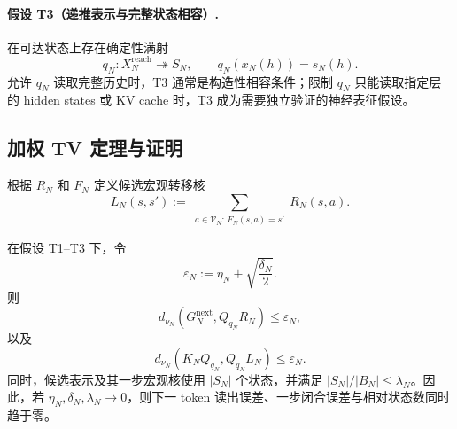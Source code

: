\paragraph{假设 T3（递推表示与完整状态相容）.}
在可达状态上存在确定性满射
\[
 q_N:X_N^{\mathrm{reach}}\twoheadrightarrow S_N,
 \qquad q_N(x_N(h))=s_N(h).
 \tag{T3}\label{eq:T3-readout}
\]
允许 $q_N$ 读取完整历史时，T3 通常是构造性相容条件；限制 $q_N$ 只能读取指定层的 hidden states 或 KV cache 时，T3 成为需要独立验证的神经表征假设。

\subsection{加权 TV 定理与证明}

根据 $R_N$ 和 $F_N$ 定义候选宏观转移核
\[
 L_N(s,s')
 :=\sum_{\substack{a\in\mathcal V_N:\,F_N(s,a)=s'}}R_N(s,a).
 \tag{\TransformerEquationPrefix.1}\label{eq:transformer-macro-kernel}
\]

\begin{theorem}
\label{thm:transformer-weighted-closure}
在假设 \textup{T1--T3} 下，令
\[
 \varepsilon_N:=\eta_N+\sqrt{\frac{\delta_N}{2}}.
 \tag{\TransformerEquationPrefix.2}\label{eq:transformer-epsilon}
\]
则
\[
 d_{\nu_N}\!\left(
 G_N^{\mathrm{next}},Q_{q_N}R_N
 \right)\le\varepsilon_N,
 \tag{\TransformerEquationPrefix.3}\label{eq:transformer-token-bound}
\]
以及
\[
 d_{\nu_N}\!\left(
 K_NQ_{q_N},Q_{q_N}L_N
 \right)\le\varepsilon_N.
 \tag{\TransformerEquationPrefix.4}\label{eq:transformer-closure-bound}
\]
同时，候选表示及其一步宏观核使用 $|S_N|$ 个状态，并满足
$|S_N|/|B_N|\le\lambda_N$。因此，若
$\eta_N,\delta_N,\lambda_N\to0$，则下一 token 读出误差、一步闭合误差与相对状态数同时趋于零。
\end{theorem}

